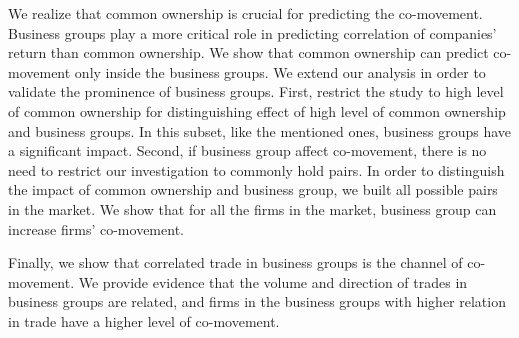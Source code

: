 	We realize that common ownership is crucial for predicting the co-movement. Business groups play a more critical role in predicting correlation of companies' return than common ownership. We show that common ownership  can predict  co-movement only inside  the business groups.
	We extend our analysis in order to validate the prominence of business groups. First, restrict the study to high level of common ownership for distinguishing effect of high level of common ownership and business groups. 
	In this subset, like the mentioned ones, business groups have a significant impact.
	Second, if business group affect co-movement, there is no need to restrict our investigation to commonly hold pairs. In order to distinguish the impact of common ownership and business group, we built all possible pairs in the market.
	We show that for all the firms in the market, business group can increase firms' co-movement. 
	
	Finally, we show that correlated trade in business groups is the channel of co-movement. We provide evidence that the volume and direction of trades in business groups are related, and firms in the business groups with higher relation in trade have a higher level of co-movement.
	
	
	

%